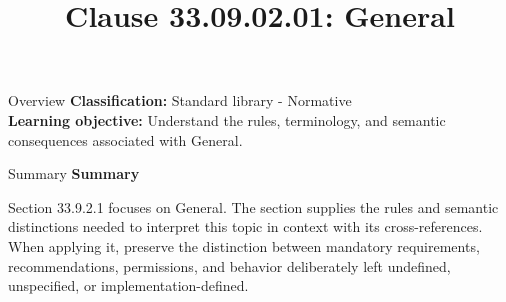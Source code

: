 \documentclass[10pt,letterpaper]{article}
\title{Clause 33.09.02.01: General}
\author{}
\date{}
\begin{document}
\maketitle
\begin{CornellOverviewBox}{Overview}
\textbf{Classification:} Standard library - Normative\\[2pt]
\textbf{Learning objective:} Understand the rules, terminology, and semantic consequences associated with General.
\end{CornellOverviewBox}\begin{CornellSummaryBox}{Summary}
{\sffamily\bfseries\color{Accent} Summary}\par\vspace{3pt}Section 33.9.2.1 focuses on General. The section supplies the rules and semantic distinctions needed to interpret this topic in context with its cross-references. When applying it, preserve the distinction between mandatory requirements, recommendations, permissions, and behavior deliberately left undefined, unspecified, or implementation-defined.
\end{CornellSummaryBox}
\end{document}
